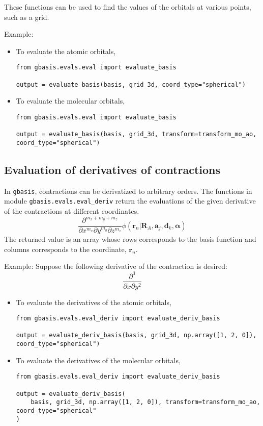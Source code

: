 \documentclass[letterpaper]{article}
\begin{document}
These functions can be used to find the values of the orbitals at various
points, such as a grid.

Example:
\begin{itemize}
\item To evaluate the atomic orbitals,
  \begin{lstlisting}[xleftmargin=-25pt]
from gbasis.evals.eval import evaluate_basis

output = evaluate_basis(basis, grid_3d, coord_type="spherical")
\end{lstlisting}
\item To evaluate the molecular orbitals,
  \begin{lstlisting}[xleftmargin=-25pt]
from gbasis.evals.eval import evaluate_basis

output = evaluate_basis(basis, grid_3d, transform=transform_mo_ao, coord_type="spherical")
\end{lstlisting}
\end{itemize}

\subsection{Evaluation of derivatives of contractions}
In \verb|gbasis|, contractions can be derivatized to arbitrary orders.
The functions in module \verb|gbasis.evals.eval_deriv| return the evaluations of the
given derivative of the contractions at different coordinates.
\begin{equation}
  \frac{\partial^{m_x + m_y + m_z}}{\partial x^{m_x} \partial y^{m_y} \partial z^{m_z}}
  \phi(\mathbf{r}_n | \mathbf{R}_{A}, \mathbf{a}_j, \mathbf{d}_k, \boldsymbol{\alpha})
\end{equation}
The returned value is an array whose rows corresponds to the basis function and
columns corresponds to the coordinate, $\mathbf{r}_n$.

Example:
Suppose the following derivative of the contraction is desired:
\begin{equation}
  \frac{\partial^3}{\partial x \partial y^2}
\end{equation}
\begin{itemize}
\item To evaluate the derivatives of the atomic orbitals,
  \begin{lstlisting}[xleftmargin=-25pt]
from gbasis.evals.eval_deriv import evaluate_deriv_basis

output = evaluate_deriv_basis(basis, grid_3d, np.array([1, 2, 0]), coord_type="spherical")
\end{lstlisting}
\item To evaluate the derivatives of the molecular orbitals,
  \begin{lstlisting}[xleftmargin=-25pt]
from gbasis.evals.eval_deriv import evaluate_deriv_basis

output = evaluate_deriv_basis(
    basis, grid_3d, np.array([1, 2, 0]), transform=transform_mo_ao, coord_type="spherical"
)
\end{lstlisting}
\end{itemize}
\end{document}
